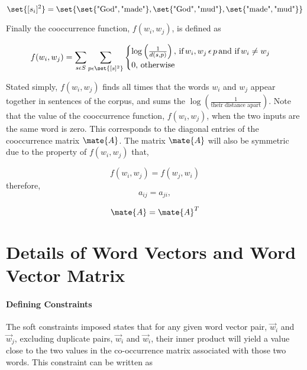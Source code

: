 \documentclass{article}
\begin{document}
\begin{equation*}
\set{[s_i]^2} = \set{\set{\text{"God"}, \text{"made"}}, \set{\text{"God"}, \text{"mud"}}, \set{\text{"made"}, \text{"mud"}} }
\end{equation*}

Finally the cooccurrence function, $f(w_i, w_j)$, is defined as

\begin{equation*}
f(w_i,w_j) = 
\sum_{s \epsilon S} { \sum_{p \epsilon \set{[s]^2} } {
\begin{cases}
\log \left(\frac{1}{d(s,p)} \right), \, \text{if} \, w_i, w_j \, \epsilon \, p \, \text{and if} \, w_i \neq w_j
\\
0, \, \text{otherwise}
\end{cases}
} }
\end{equation*}

Stated simply, $f(w_i, w_j)$ finds all times that the words $w_i$ and $w_j$ appear together in sentences of the corpus, and sums the $\log \left( \frac{1}{\text{their distance apart}} \right)$. Note that the value of the cooccurrence function, $f(w_i, w_j)$, when the two inputs are the same word is zero. This corresponds to the diagonal entries of the cooccurrence matrix $\mate{A}$. The matrix $\mate{A}$ will also be symmetric due to the property of $f(w_i, w_j)$ that,

\begin{equation*}
f(w_i,w_j) = f(w_j,w_i)
\end{equation*}
therefore,
\begin{equation*}
a_{ij} = a_{ji},
\end{equation*}

\begin{equation*}
\mate{A} = \mate{A}^T
\end{equation*}


%
%

\section{Details of Word Vectors and Word Vector Matrix}

\paragraph{Defining Constraints} The soft constraints imposed states that for any given word vector pair, $\vec{w}_{i}$ and $\vec{w}_{j}$, excluding duplicate pairs, $\vec{w}_{i}$ and $\vec{w}_{i}$, their inner product will yield a value close to the two values in the co-occurrence matrix associated with those two words. This constraint can be written as
		
\end{document}
